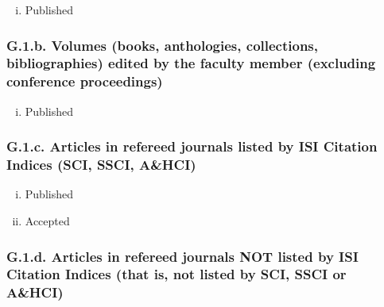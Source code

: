 \documentclass[12pt]{article}
\begin{document}
{{\begin{enumerate}[i)]
\item Published  %
\end{enumerate}

\subsubsection*{G.1.b. Volumes (books, anthologies, collections, bibliographies) edited by the faculty member (excluding conference proceedings)}


\begin{enumerate}[i)]
\item Published  %
\end{enumerate}



\subsubsection*{G.1.c. Articles in refereed journals listed by ISI Citation Indices (SCI, SSCI, A\&HCI)}


\begin{enumerate}[i)]
\item Published %

\item Accepted %
\end{enumerate}

\subsubsection*{G.1.d. Articles in refereed journals NOT listed by ISI Citation Indices (that is, not listed by SCI, SSCI or A\&HCI)}
 
}}
\end{document}
